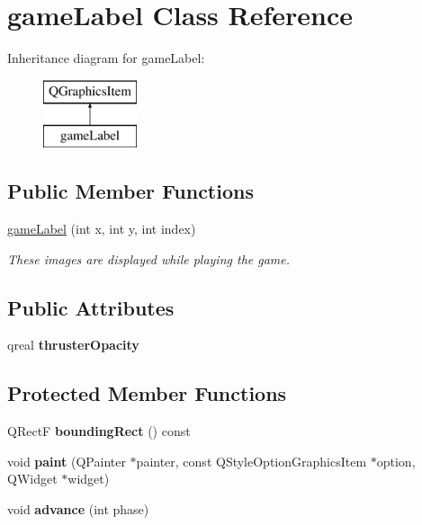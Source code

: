 \hypertarget{classgame_label}{\section{game\-Label Class Reference}
\label{classgame_label}
}
Inheritance diagram for game\-Label\-:\begin{figure}[H]
\begin{center}
\leavevmode
\includegraphics[height=2.000000cm]{classgame_label}
\end{center}
\end{figure}
\subsection*{Public Member Functions}
\begin{DoxyCompactItemize}
\item 
\hyperlink{classgame_label_a9748a8acd420734f3f9292012d466911}{game\-Label} (int x, int y, int index)
\begin{DoxyCompactList}\small\item\em These images are displayed while playing the game. \end{DoxyCompactList}\end{DoxyCompactItemize}
\subsection*{Public Attributes}
\begin{DoxyCompactItemize}
\item 
\hypertarget{classgame_label_a6cef4594f29c0b5b0832ddabdcf27486}{qreal {\bfseries thruster\-Opacity}}\label{classgame_label_a6cef4594f29c0b5b0832ddabdcf27486}

\end{DoxyCompactItemize}
\subsection*{Protected Member Functions}
\begin{DoxyCompactItemize}
\item 
\hypertarget{classgame_label_ac38388c37b084d142c953920fab4d462}{Q\-Rect\-F {\bfseries bounding\-Rect} () const }\label{classgame_label_ac38388c37b084d142c953920fab4d462}

\item 
\hypertarget{classgame_label_a0a0fad187a508d23b7a657a54befd441}{void {\bfseries paint} (Q\-Painter $\ast$painter, const Q\-Style\-Option\-Graphics\-Item $\ast$option, Q\-Widget $\ast$widget)}\label{classgame_label_a0a0fad187a508d23b7a657a54befd441}

\item 
\hypertarget{classgame_label_a652636ae957c00c790cc65ff59cb95c1}{void {\bfseries advance} (int phase)}\label{classgame_label_a652636ae957c00c790cc65ff59cb95c1}

\end{DoxyCompactItemize}
